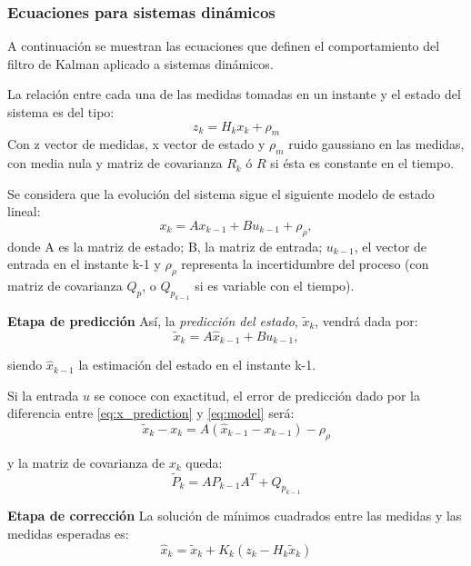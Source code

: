 \subsubsection{Ecuaciones para sistemas dinámicos}
A continuación se muestran las ecuaciones que definen el comportamiento del filtro de Kalman aplicado a sistemas dinámicos\cite{Schutter99}.

La relación entre cada una de las medidas tomadas en un instante y el estado del sistema es del tipo:
\begin{equation}\label{eq:measurement}
   z_{k} = H_{k}x_{k}+\rho_{m}
\end{equation}
Con z vector de medidas, x vector de estado y $\rho_{m}$ ruido gaussiano en las medidas, con media nula y matriz de covarianza $R_{k}$ ó $R$ si ésta es constante en el tiempo.

Se considera que la evolución del sistema sigue el siguiente modelo de estado lineal:
\begin{equation}\label{eq:model}
    x_{k} = Ax_{k-1}+Bu_{k-1}+\rho_{\rho},
\end{equation}
donde A es la matriz de estado; B, la matriz de entrada; $u_{k-1}$, el vector de entrada en el instante k-1 y $\rho_{\rho}$ representa la incertidumbre del proceso (con matriz de covarianza $Q_{p}$, o $Q_{p_{k-1}}$ si es variable con el tiempo).


\textbf{Etapa de predicción}
Así, la \emph{predicción del estado}, $\tilde{x}_{k}$, vendrá dada por:
\begin{equation}\label{eq:x_prediction}
    \tilde{x}_{k} = A\hat{x}_{k-1}+Bu_{k-1},
\end{equation}

siendo $\hat{x}_{k-1}$ la estimación del estado en el instante k-1.

Si la entrada $u$ se conoce con exactitud, el error de predicción dado por la diferencia entre \ref{eq:x_prediction} y \ref{eq:model} será:
\begin{equation}\label{eq:prediction_error}
    \tilde{x}_{k}-x_{k} = A(\hat{x}_{k-1}-x_{k-1})- \rho_{\rho}
\end{equation}

y la matriz de covarianza de $x_{k}$ queda:
\begin{equation}\label{eq:P_prediction}
    \tilde{P}_{k} = A\hat{P}_{k-1}A^{T}+Q_{p_{k-1}}
\end{equation}


\textbf{Etapa de corrección}
La solución de mínimos cuadrados entre las medidas y las medidas esperadas es:
\begin{equation}\label{eq:x_estimation}
    \hat{x}_{k} = \tilde{x}_{k}+K_{k}(z_{k}-H_{k}\tilde{x}_{k})
\end{equation}

